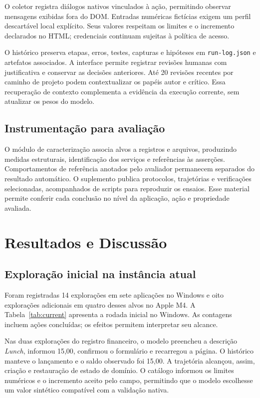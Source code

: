 \documentclass[12pt]{article}
\begin{document}
O coletor registra diálogos nativos vinculados à ação, permitindo observar mensagens exibidas fora do DOM. Entradas numéricas fictícias exigem um perfil descartável local explícito. Seus valores respeitam os limites e o incremento declarados no HTML; credenciais continuam sujeitas à política de acesso.

O histórico preserva etapas, erros, testes, capturas e hipóteses em \texttt{run-log.json} e artefatos associados. A interface permite registrar revisões humanas com justificativa e conservar as decisões anteriores. Até 20 revisões recentes por caminho de projeto podem contextualizar os papéis autor e crítico. Essa recuperação de contexto complementa a evidência da execução corrente, sem atualizar os pesos do modelo.

\subsection{Instrumentação para avaliação}
O módulo de caracterização associa alvos a registros e arquivos, produzindo medidas estruturais, identificação dos serviços e referências às asserções. Comportamentos de referência anotados pelo avaliador permanecem separados do resultado automático. O suplemento publica protocolos, trajetórias e verificações selecionadas, acompanhados de scripts para reproduzir os ensaios. Esse material permite conferir cada conclusão no nível da aplicação, ação e propriedade avaliada.

\section{Resultados e Discussão}\label{sec:results}
\subsection{Exploração inicial na instância atual}
Foram registradas 14 explorações em sete aplicações no Windows e oito explorações adicionais em quatro desses alvos no Apple M4. A Tabela~\ref{tab:current} apresenta a rodada inicial no Windows. As contagens incluem ações concluídas; os efeitos permitem interpretar seu alcance.



Nas duas explorações do registro financeiro, o modelo preencheu a descrição \textit{Lunch}, informou 15,00, confirmou o formulário e recarregou a página. O histórico manteve o lançamento e o saldo observado foi 15,00. A trajetória alcançou, assim, criação e restauração de estado de domínio. O catálogo informou os limites numéricos e o incremento aceito pelo campo, permitindo que o modelo escolhesse um valor sintético compatível com a validação nativa.
\end{document}
